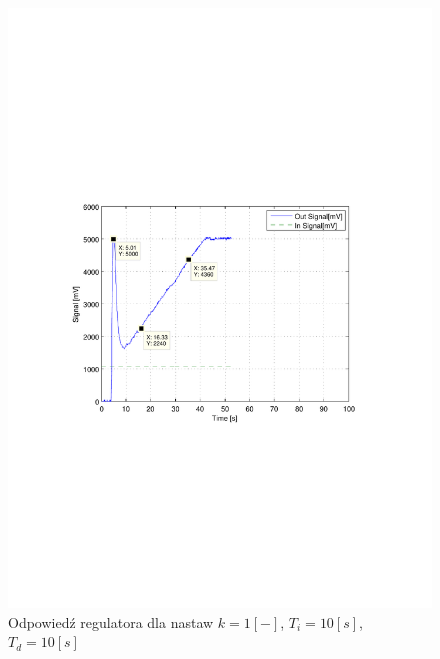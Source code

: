 \documentclass[12pt]{article}
\begin{document}
\newpage

\begin{figure}[!htb]
	\begin{center}
		\includegraphics[width=12cm,trim=3cm 9cm 3cm 9cm,clip]
		{../res/img/cont_1_10_10.pdf}
	\end{center}
	\caption{Odpowiedź regulatora dla nastaw $k=1[-]$, $T_i=10[s]$, $T_d=10[s]$}
\end{figure}
\end{document}
